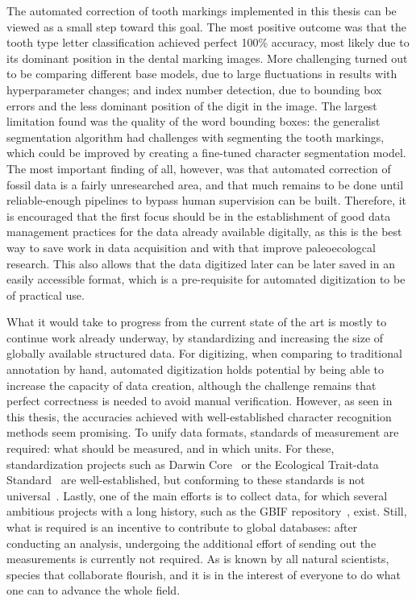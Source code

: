 \documentclass[english,twoside,openright]{UH_DS_MSc}
\begin{document}
The automated correction of tooth markings implemented in this thesis can be viewed as a small step toward this goal. The most positive outcome was that the tooth type letter classification achieved perfect 100\% accuracy, most likely due to its dominant position in the dental marking images. More challenging turned out to be comparing different base models, due to large fluctuations in results with hyperparameter changes; and index number detection, due to bounding box errors and the less dominant position of the digit in the image. The largest limitation found was the quality of the word bounding boxes: the generalist segmentation algorithm had challenges with segmenting the tooth markings, which could be improved by creating a fine-tuned character segmentation model. The most important finding of all, however, was that automated correction of fossil data is a fairly unresearched area, and that much remains to be done until reliable-enough pipelines to bypass human supervision can be built. Therefore, it is encouraged that the first focus should be in the establishment of good data management practices for the data already available digitally, as this is the best way to save work in data acquisition and with that improve paleoecologcal research. This also allows that the data digitized later can be later saved in an easily accessible format, which is a pre-requisite for automated digitization to be of practical use.

What it would take to progress from the current state of the art is mostly to continue work already underway, by standardizing and increasing the size of globally available structured data.
For digitizing, when comparing to traditional annotation by hand, automated digitization holds potential by being able to increase the capacity of data creation, although the challenge remains that perfect correctness is needed to avoid manual verification. However, as seen in this thesis, the accuracies achieved with well-established character recognition methods seem promising.
To unify data formats, standards of measurement are required: what should be measured, and in which units. For these, standardization projects such as Darwin Core~\cite{darwincore} or the Ecological Trait-data Standard~\cite{ets-trait-data-standard} are well-established, but conforming to these standards is not universal~\cite{groomImprovedStandardizationTranscribed2019}.
Lastly, one of the main efforts is to collect data, for which several ambitious projects with a long history, such as the GBIF repository~\cite{gbif}, exist.
 Still, what is required is an incentive to contribute to global databases: after 
conducting an analysis, undergoing the additional effort of sending out the measurements is currently not required. As is known by all natural scientists, species that collaborate flourish, and it is in the interest of everyone to do what one can to advance the whole field.
\end{document}

